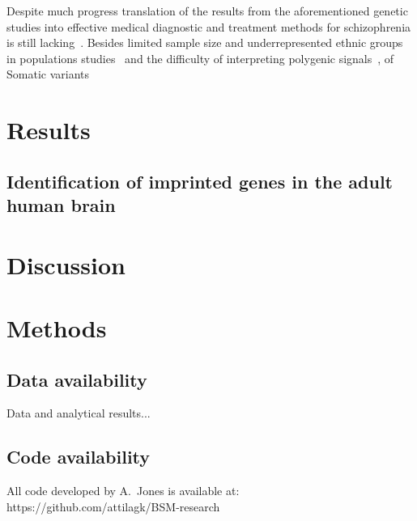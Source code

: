 \documentclass[letterpaper]{article}
\begin{document}
Despite much progress translation of the results from the aforementioned
genetic studies into effective medical diagnostic and treatment methods for
schizophrenia is still lacking~\cite{Breen2016,Foley2017}.  Besides limited sample size and underrepresented
ethnic groups in populations studies~\cite{Visscher2017} and the difficulty of
interpreting polygenic signals~\cite{Boyle2017},
of 
Somatic variants \cite{Insel2014}


\section*{Results}

\subsection*{Identification of imprinted genes in the adult human brain}

\section*{Discussion}


\section*{Methods}


\subsection*{Data availability}

Data and analytical results...

\subsection*{Code availability}

All code developed by A.~Jones is available at:\\
https://github.com/attilagk/BSM-research
\end{document}
